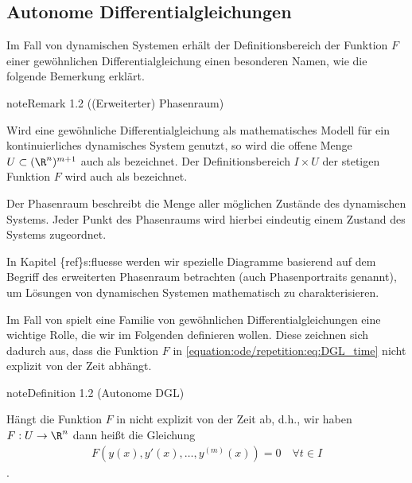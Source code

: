 \documentclass[letterpaper,10pt,english]{jupyterBook}
\begin{document}
\subsection{Autonome Differentialgleichungen}
\label{\detokenize{ode/repetition:autonome-differentialgleichungen}}
\sphinxAtStartPar
Im Fall von dynamischen Systemen erhält der Definitionsbereich der Funktion \(F\) einer gewöhnlichen Differentialgleichung einen besonderen Namen, wie die folgende Bemerkung erklärt.
\label{ode/repetition:remark-2}
\begin{sphinxadmonition}{note}{Remark 1.2 ((Erweiterter) Phasenraum)}



\sphinxAtStartPar
Wird eine gewöhnliche Differentialgleichung als mathematisches Modell für ein kontinuierliches dynamisches System genutzt, so wird die offene Menge \(U\subset (\R^n)^{m+1}\) auch als  bezeichnet.
Der Definitionsbereich \(I\times U\) der stetigen Funktion \(F\) wird auch als  bezeichnet.

\sphinxAtStartPar
Der Phasenraum beschreibt die Menge aller möglichen Zustände des dynamischen Systems.
Jeder Punkt des Phasenraums wird hierbei eindeutig einem Zustand des Systems zugeordnet.

\sphinxAtStartPar
In Kapitel \{ref\}s:fluesse werden wir spezielle Diagramme basierend auf dem Begriff des erweiterten Phasenraum betrachten (auch Phasenportraits genannt), um Lösungen von dynamischen Systemen mathematisch zu charakterisieren.
\end{sphinxadmonition}

\sphinxAtStartPar
Im Fall von  spielt eine Familie von gewöhnlichen Differentialgleichungen eine wichtige Rolle, die wir im Folgenden definieren wollen.
Diese zeichnen sich dadurch aus, dass die Funktion \(F\) in \eqref{equation:ode/repetition:eq:DGL_time} nicht explizit von der Zeit abhängt.
\label{ode/repetition:definition-3}
\begin{sphinxadmonition}{note}{Definition 1.2 (Autonome DGL)}



\sphinxAtStartPar
Hängt die Funktion \(F\) in {\hyperref[\detokenize{ode/repetition:def:DGL}]{}} nicht explizit von der Zeit ab, d.h., wir haben \(F:U\rightarrow\R^n\) dann heißt die Gleichung
\begin{equation}\label{equation:ode/repetition:eq:autonome_DGL}
\begin{split}F(y(x), y'(x), \ldots, y^{(m)}(x)) = 0 \quad \forall t\in I\end{split}
\end{equation}
\sphinxAtStartPar
{}.
\end{sphinxadmonition}
\end{document}
